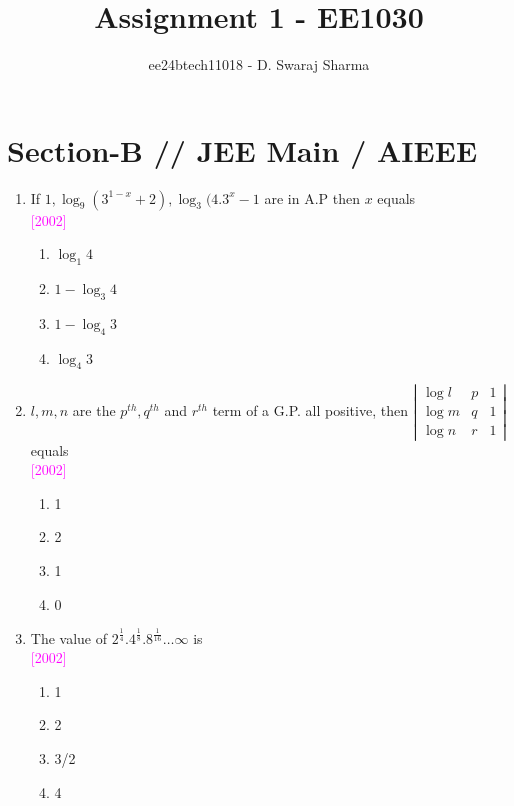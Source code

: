 \documentclass[journal,12pt,twocolumn]{IEEEtran}
\theoremstyle{remark}
\begin{document}

\vspace{3cm}

\title{Assignment 1 - EE1030}
\author{ee24btech11018 - D. Swaraj Sharma}
\maketitle
\newpage
\bigskip

\renewcommand{\thefigure}{\theenumi}
\renewcommand{\thetable}{\theenumi}

\section*{\textbf{Section-B} // \textbf{JEE Main} / \textbf{AIEEE}}

\begin{enumerate}[label=\textcolor{magenta}{\arabic*.}]


\item {If $ 1, \log_9 (3^{1-x} +2), \log_3 (4.3^x -1$ are in A.P then $x$ equals}\\ \textcolor {magenta}{\hfill{[2002]}} \\ 
\begin{enumerate}[label={(\alph*)}]
\item  {$\log_1 4$}
 \item {$1-\log_3 4$}
 \item {$1-\log_4 3$}
 \item {$\log_4 3$}
\end{enumerate}
\item {$l, m, n$ are the $p^{th}, q^{th}$ and $r^{th}$ term of a G.P. all positive, then $\left|\begin{matrix} \log l & p & 1 \\ \log m & q & 1 \\ \log n & r & 1 \end{matrix}\right|$ equals}\\ \textcolor {magenta}{\hfill{[2002]}} \\
\begin{enumerate}[label={(\alph*)}]
\item{1}
\item{2}
\item{1}
\item{0}
\end{enumerate}

\item {The value of $2^{\frac{1}{4}} . 4^{\frac{1}{8}} . 8^{\frac{1}{16}} \ldots \infty$ is}\\ \textcolor {magenta}{\hfill{[2002]}} \\
\begin{enumerate}[label={(\alph*)}]
\item  {1}
\item  {2}
\item  {3/2}
\item  {4}
\end{enumerate}


\end{enumerate}
\end{document}
